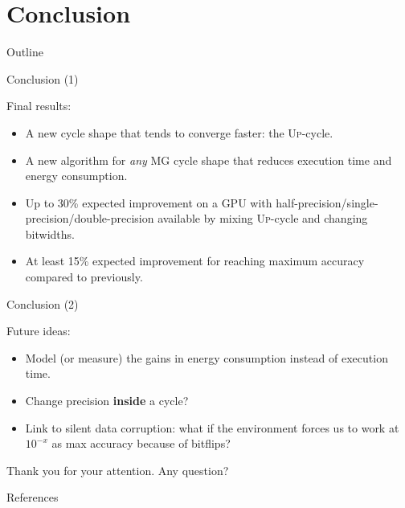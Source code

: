 \documentclass[hyperref={pdfpagelabels=false}]{beamer}
\begin{document}
\section{Conclusion}

\begin{frame}{Outline}
 \tableofcontents[currentsection]
\end{frame}

\begin{frame}{Conclusion (1)}

  Final results:
 \begin{itemize}
  \item A new cycle shape that tends to converge faster: the \textsc{Up}-cycle.
  \item A new algorithm for \textit{any} MG cycle shape that reduces execution time and energy consumption.
  \item Up to 30\% expected improvement on a GPU with half-precision/single-precision/double-precision available by mixing \textsc{Up}-cycle and changing bitwidths.
  \item At least 15\% expected improvement for reaching maximum accuracy compared to previously.
 \end{itemize}

\end{frame}

\begin{frame}{Conclusion (2)}

 Future ideas:
 \begin{itemize}
  \item Model (or measure) the gains in energy consumption instead of execution time.
  \item Change precision \textbf{inside} a cycle?
  \item Link to silent data corruption: what if the environment forces us to work at $10^{-x}$ as max accuracy because of bitflips?
 \end{itemize}

 \pause
 \vspace{0.8cm}
 \begin{center}
  \Large
    Thank you for your attention. Any question?
 \end{center}


\end{frame}

\begin{frame}{References}


\end{frame}
\end{document}
